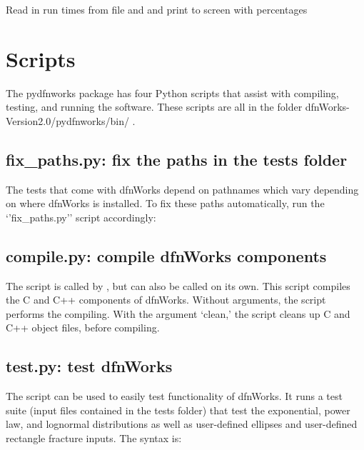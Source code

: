 \documentclass[letterpaper,10pt,english]{sphinxmanual}
\begin{document}

\begin{fulllineitems}
\label{\detokenize{pydfnworks:pydfnworks.helper.print_run_time}}
Read in run times from file and and print to screen with percentages

\end{fulllineitems}



\chapter{Scripts}
\label{\detokenize{scripts:scripts}}\label{\detokenize{scripts::doc}}\label{\detokenize{scripts:scripts-chapter}}
The pydfnworks package has four Python scripts that assist with compiling, testing, and running the software. These scripts are all in the folder dfnWorks-Version2.0/pydfnworks/bin/ .


\section{fix\_paths.py: fix the paths in the tests folder}
\label{\detokenize{scripts:fix-paths-py-fix-the-paths-in-the-tests-folder}}
The tests that come with dfnWorks depend on pathnames which vary depending on where dfnWorks is installed. To fix these paths automatically, run the `'fix\_paths.py'' script accordingly:



\section{compile.py: compile dfnWorks components}
\label{\detokenize{scripts:compile-py-compile-dfnworks-components}}
The  script is called by , but can also be called on its own. This script compiles the C and C++ components of dfnWorks. Without arguments, the script performs the compiling. With the argument `clean,' the script cleans up C and C++ object files, before compiling.


\section{test.py: test dfnWorks}
\label{\detokenize{scripts:test-py-test-dfnworks}}
The  script can be used to easily test functionality of dfnWorks. It runs a test suite (input files contained in the tests folder) that test the exponential, power law, and lognormal distributions as well as user-defined ellipses and user-defined rectangle fracture inputs. The syntax is:
\end{document}
